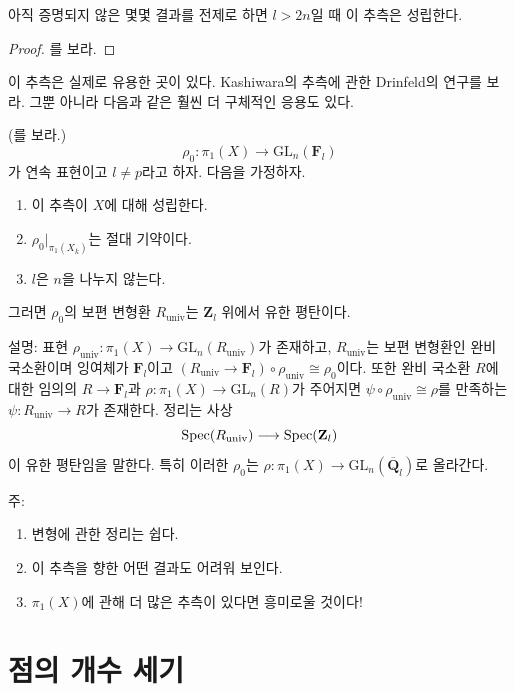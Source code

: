 \begin{theorem}
\label{theorem-conjecture-l-bigger-2n}
아직 증명되지 않은 몇몇 결과를 전제로 하면 $l > 2n$일 때
이 추측은 성립한다.
\end{theorem}

\begin{proof}
\cite{Gaitsgory}를 보라.
\end{proof}

\noindent
이 추측은 실제로 유용한 곳이 있다.
Kashiwara의 추측에 관한 Drinfeld의 연구를 보라. 그뿐 아니라 다음과
같은 훨씬 더 구체적인 응용도 있다.

\begin{theorem}
\label{theorem-deformation-rings}
(\cite[Theorem 3.5]{dJ-conjecture}를 보라.)
$$
\rho_0: \pi_1(X)\to \text{GL}_n(\mathbf{F}_l)
$$
가 연속 표현이고 $l\neq p$라고 하자. 다음을 가정하자.
\begin{enumerate}
\item 이 추측이 $X$에 대해 성립한다.
\item $\rho_0 |_{\pi_1(X_{\overline{k}})}$는 절대 기약이다.
\item $l$은 $n$을 나누지 않는다.
\end{enumerate}
그러면 $\rho_0$의 보편 변형환 $R_{\text{univ}}$는
$\mathbf{Z}_l$ 위에서 유한 평탄이다.
\end{theorem}

\noindent
설명: 표현 $\rho_{\text{univ}}:
\pi_1(X)\to \text{GL}_n(R_{\text{univ}})$가 존재하고,
$R_{\text{univ}}$는 보편 변형환인 완비 국소환이며 잉여체가
$\mathbf{F}_l$이고
$(R_{\text{univ}}\to
\mathbf{F}_l)\circ\rho_{\text{univ}}\cong\rho_0$이다.
또한 완비 국소환 $R$에 대한 임의의 $R\to \mathbf{F}_l$과
$\rho : \pi_1(X)\to \text{GL}_n(R)$가 주어지면
$\psi\circ\rho_{\text{univ}}\cong \rho$를 만족하는
$\psi : R_{\text{univ}}\to R$가 존재한다. 정리는 사상
$$
\mathop{\mathrm{Spec}}(R_{\text{univ}})
\longrightarrow
\mathop{\mathrm{Spec}}(\mathbf{Z}_l)
$$
이 유한 평탄임을 말한다. 특히 이러한 $\rho_0$는
$\rho : \pi_1(X) \to \text{GL}_n(\overline{\mathbf{Q}}_l)$로 올라간다.

\medskip\noindent
주:
\begin{enumerate}
\item 변형에 관한 정리는 쉽다.
\item 이 추측을 향한 어떤 결과도 어려워 보인다.
\item $\pi_1(X)$에 관해 더 많은 추측이 있다면 흥미로울 것이다!
\end{enumerate}




\section{점의 개수 세기}
\label{section-counting}


